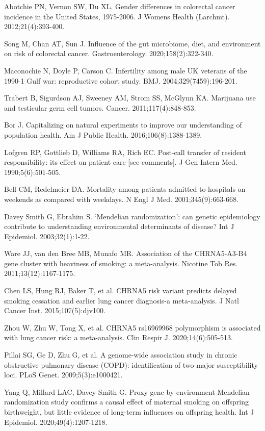 \begin{references}
\item Abotchie PN, Vernon SW, Du XL. Gender differences in colorectal cancer incidence in the United States, 1975-2006. J Womens Health (Larchmt). 2012;21(4):393-400.
\item Song M, Chan AT, Sun J. Influence of the gut microbiome, diet, and environment on risk of colorectal cancer. Gastroenterology. 2020;158(2):322-340.
\item Maconochie N, Doyle P, Carson C. Infertility among male UK veterans of the 1990-1 Gulf war: reproductive cohort study. BMJ. 2004;329(7459):196-201.
\item Trabert B, Sigurdson AJ, Sweeney AM, Strom SS, McGlynn KA. Marijuana use and testicular germ cell tumors. Cancer. 2011;117(4):848-853.
\item Bor J. Capitalizing on natural experiments to improve our understanding of population health. Am J Public Health. 2016;106(8):1388-1389.
\item Lofgren RP, Gottlieb D, Williams RA, Rich EC. Post-call transfer of resident responsibility: its effect on patient care [see comments]. J Gen Intern Med. 1990;5(6):501-505.
\item Bell CM, Redelmeier DA. Mortality among patients admitted to hospitals on weekends as compared with weekdays. N Engl J Med. 2001;345(9):663-668.
\item Davey Smith G, Ebrahim S. ‘Mendelian randomization’: can genetic epidemiology contribute to understanding environmental determinants of disease? Int J Epidemiol. 2003;32(1):1-22.
\item Ware JJ, van den Bree MB, Munafo MR. Association of the CHRNA5-A3-B4 gene cluster with heaviness of smoking: a meta-analysis. Nicotine Tob Res. 2011;13(12):1167-1175.
\item Chen LS, Hung RJ, Baker T, et al. CHRNA5 risk variant predicts delayed smoking cessation and earlier lung cancer diagnosis-a meta-analysis. J Natl Cancer Inst. 2015;107(5):djv100.
\item Zhou W, Zhu W, Tong X, et al. CHRNA5 rs16969968 polymorphism is associated with lung cancer risk: a meta-analysis. Clin Respir J. 2020;14(6):505-513.
\item Pillai SG, Ge D, Zhu G, et al. A genome-wide association study in chronic obstructive pulmonary disease (COPD): identification of two major susceptibility loci. PLoS Genet. 2009;5(3):e1000421.
\item Yang Q, Millard LAC, Davey Smith G. Proxy gene-by-environment Mendelian randomization study confirms a causal effect of maternal smoking on offspring birthweight, but little evidence of long-term influences on offspring health. Int J Epidemiol. 2020;49(4):1207-1218.

\end{references}
